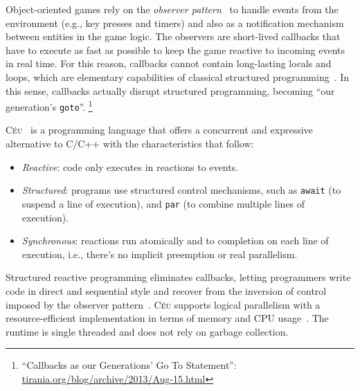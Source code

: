 \documentclass{vgtc}                          %
\newcommand{\CEU}{\textsc{C\'{e}u}\xspace}
\newcommand{\code}[1] {{\small{\texttt{#1}}}}
\begin{document}

Object-oriented games rely on the \emph{observer pattern}~\cite{games.patterns}
to handle events from the environment (e.g., key presses and timers) and also
as a notification mechanism between entities in the game logic.
%
The observers are short-lived callbacks that have to execute as fast as
possible to keep the game reactive to incoming events in real time.
%
For this reason, callbacks cannot contain long-lasting locals and loops, which
are elementary capabilities of classical structured
programming~\cite{rp.deprecating,rp.rescala,sync_async.cooperative}.
%
In this sense, callbacks actually disrupt structured programming, becoming
``our generation's \code{goto}''.%
\footnote{``Callbacks as our Generations' Go To Statement'':
\url{tirania.org/blog/archive/2013/Aug-15.html}}

\CEU~\cite{ceu.sensys13,ceu.mod15} is a programming language that offers a
concurrent and expressive alternative to C/C++ with the characteristics that
follow:
%
\begin{itemize}
\item \emph{Reactive}: code only executes in reactions to events.
\item \emph{Structured}: programs use structured control mechanisms, such as
      \code{await} (to suspend a line of execution), and \code{par} (to combine
      multiple lines of execution).
\item \emph{Synchronous}: reactions run atomically and to completion on each
      line of execution, i.e., there's no implicit preemption or real
      parallelism.
\end{itemize}
%
Structured reactive programming eliminates callbacks, letting programmers write
code in direct and sequential style and recover from the inversion of control
imposed by the observer pattern~\cite{rp.deprecating}.
%
\CEU supports logical parallelism with a resource-efficient implementation in
terms of memory and CPU usage~\cite{ceu.sensys13}.
The runtime is single threaded and does not rely on garbage collection.
\end{document}
